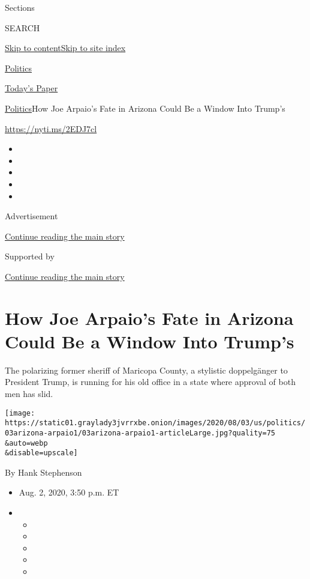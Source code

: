 Sections

SEARCH

\protect\hyperlink{site-content}{Skip to
content}\protect\hyperlink{site-index}{Skip to site index}

\href{https://www.nytimes3xbfgragh.onion/section/politics}{Politics}

\href{https://myaccount.nytimes3xbfgragh.onion/auth/login?response_type=cookie\&client_id=vi}{}

\href{https://www.nytimes3xbfgragh.onion/section/todayspaper}{Today's
Paper}

\href{/section/politics}{Politics}\textbar{}How Joe Arpaio's Fate in
Arizona Could Be a Window Into Trump's

\url{https://nyti.ms/2EDJ7cl}

\begin{itemize}
\item
\item
\item
\item
\item
\end{itemize}

Advertisement

\protect\hyperlink{after-top}{Continue reading the main story}

Supported by

\protect\hyperlink{after-sponsor}{Continue reading the main story}

\hypertarget{how-joe-arpaios-fate-in-arizona-could-be-a-window-into-trumps}{%
\section{How Joe Arpaio's Fate in Arizona Could Be a Window Into
Trump's}\label{how-joe-arpaios-fate-in-arizona-could-be-a-window-into-trumps}}

The polarizing former sheriff of Maricopa County, a stylistic
doppelgänger to President Trump, is running for his old office in a
state where approval of both men has slid.

\texttt{[image: https://static01.graylady3jvrrxbe.onion/images/2020/08/03/us/politics/03arizona-arpaio1/03arizona-arpaio1-articleLarge.jpg?quality=75\\\&auto=webp\\\&disable=upscale]}

By Hank Stephenson

\begin{itemize}
\item
  Aug. 2, 2020, 3:50 p.m. ET
\item
  \begin{itemize}
  \item
  \item
  \item
  \item
  \item
  \end{itemize}
\end{itemize}

